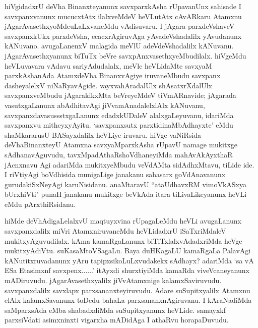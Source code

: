 \begin{artha}
hiVgidadxrU deVha Binanxteyanunx savxparxkAsha rUpavanUnx sahisade I savxpanxvanunx mucucxtAtx ilalxveMdeV heVLutAtx cAvARkaru Atamxnu jAgarAvasethxyoMdeuLaLxvaneMdu vAdisuvaru. I jAgara parxdeVshaveV savxpanxkUkx parxdeVsha, ecacxrAgiruvAga yAvadeVshadalilx yAvudanunx kANuvano. avugaLanenxV malagida meVlU adeVdeVshadalilx kANuvanu. jAgarAvasethxyanunx biTuTx beVre savxpAnxvasethxyeMbudilalx. hiVgeMdu heVLuvavara vAdavu sariyAdudalalx, meVle heVLidaMte savxyaM parxkAshanAda AtamxdeVha BinanxvAgiye iruvaneMbudu savxpanx dasheyalelxV niNaRyavAgide. vayxvahAradalUlx shAsatxrXdalUlx savxpanxveMbudu jAgarakikxMta beVreyeMdeV tiVmARnavide; jAgarada vasutxgaLanunx abAdhitavAgi jiVvamAnadalelxlAlx kANuvanu, savxpanxdavasussstxgaLanunx edadxkUDaleV alalxgaLeyuvanu, idariMda savxpanxvu mitheyxyAyitu. `savxpanxsutx parxtidinaMbAdhayxte' eMdu shaMkararusU BASayxdalilx heVLiye iruvaru. hiVge vaNiRsida deVhaBinanxteyU Atamxna savxyaMparxkAsha rUpavU namage mukitxge sAdhanavAguvudu, tavxMpadAthaRshoVdhaneyiMda mahAvAkAyxthaR jAcnxnavu Agi adariMda mukitxyeMbudu veVdAMta sidAdhxMtavu, tiLide ide. I riVtiyAgi boVdhisida munigaLige janakanu sahasarx goVdAnavanunx gurudakiSxNeyAgi karuNisidanu. anaMtaravU ``ataUdhavxRM vimoVkASxya bUrxhiVti" punaH janakanu mukitxge beVkAda itara tiLivaLikeyanunx heVLi eMdu pArxthiRsidanu. 
\end{artha}%


\begin{artha}
hiMde deVhAdigaLelalxvU maqtuyxvina rUpagaLeMdu heVLi avugaLanunx savxpanxdalilx miVri AtamxniruvaneMdu heVLidadxrU iSaTxriMdaleV mukitxyAguvudilalx. kAma kamaRgaLanunx biTiTxlalxvAdadxriMda heVge mukitxyAdiVtu. suKasaMtoVSagaLu. Baya duHKagaLU kamaRgaLa PalavAgi kANutitxruvadanunx yAru tapipxsikoLuLxvudakekx sAdhayx? adariMda `sa vA ESa Etasimxnf savxpenx......' itAyxdi shurxtiyiMda kamaRda viveVcaneyanunx mADiruvudu. jAgarAvasethxyalilx jiVvAtamxnige kalamxSaviruvudu. savxpanxdalilx savxlapx parxsananxteyiruvudu. Adare suSupitxyalilx Atamxnu elAlx kalamxSavanunx toDedu bahaLa parxsananxnAgiruvanu. I kAraNadiMda saMparxsAda eMba shabadxdiMda suSupitxyanunx heVLide. samayxkf parxsiVdati asimxninxti vigarxha mADidAga I athaRvu horapaDuvudu. 
\end{artha}

